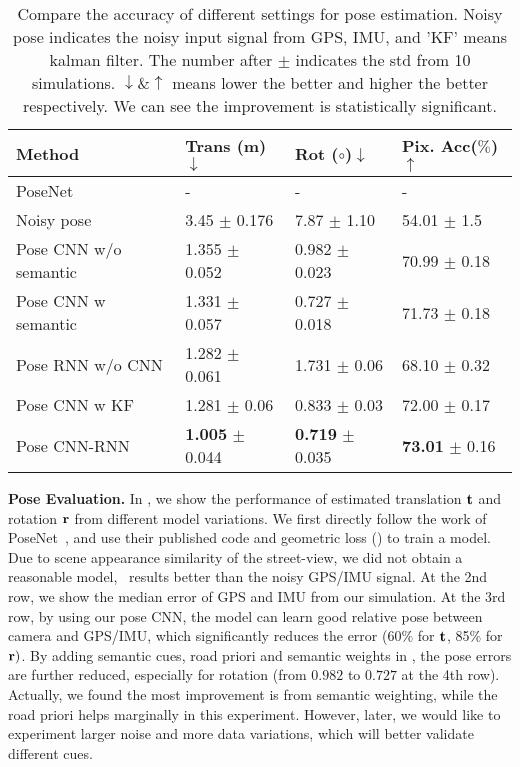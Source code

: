 \begin{table}
\vspace{-0\baselineskip}
\center
\fontsize{7}{8}\selectfont
\hspace*{-0.33cm}
\begin{tabular}{llll}
\toprule[0.1 em]
Method & Trans (m) $\downarrow$ & Rot ($\circ$)$\downarrow$  & Pix. Acc($\%$)$\uparrow$ \\
\hline
PoseNet~\cite{kendall2017geometric} & -  & -  & -  \\
Noisy pose & 3.45 $\pm$ 0.176 & 7.87 $\pm$ 1.10 & 54.01 $\pm$ 1.5 \\
Pose CNN w/o semantic & 1.355 $\pm$ 0.052  & 0.982 $\pm$ 0.023 & 70.99 $\pm$ 0.18 \\
Pose CNN w semantic & 1.331 $\pm$ 0.057  & 0.727 $\pm$ 0.018 & 71.73 $\pm$ 0.18  \\
Pose RNN w/o CNN & 1.282 $\pm$ 0.061  & 1.731 $\pm$ 0.06 &  68.10 $\pm$ 0.32 \\
Pose CNN w KF & 1.281 $\pm$ 0.06  & 0.833 $\pm$ 0.03 & 72.00 $\pm$ 0.17  \\
Pose CNN-RNN  & \textbf{1.005} $\pm$ 0.044  & \textbf{0.719} $\pm$ 0.035  & \textbf{73.01} $\pm$ 0.16  \\
\toprule[0.1 em]
\end{tabular}
\caption{Compare the accuracy of different settings for pose estimation.
Noisy pose indicates the noisy input signal from GPS, IMU, and 'KF' means kalman filter.
The number after $\pm$ indicates the std from 10 simulations. $\downarrow \& \uparrow$ means lower the better and higher the better respectively. 
We can see the improvement is statistically significant.}
\label{tbl:pose}
\vspace{-1.5\baselineskip}
\end{table}

\textbf{Pose Evaluation.}
In , we show the performance of estimated translation ${\mathbf t}$ and rotation ${\mathbf r}$ from different model variations. We first directly follow the work of PoseNet~\cite{Kendall_2015_ICCV,kendall2017geometric}, and use their published code and geometric loss () to train a model. 
Due to scene appearance similarity of the street-view, we did not obtain a reasonable model, \ie~results better than the noisy GPS/IMU signal.
At the 2nd row, we show the median error of GPS and IMU from our simulation. 
At the 3rd row, by using our pose CNN, the model can learn good relative pose between camera and GPS/IMU, which significantly reduces the error (60$\%$ for ${\mathbf t}$, 85$\%$ for ${\mathbf r})$. 
By adding semantic cues, \ie road priori and semantic weights in , the pose errors are further reduced, especially for rotation (from $0.982$ to $0.727$ at the 4th row). Actually, we found the most improvement is from semantic weighting, while the road priori helps marginally in this experiment. However, later, we would like to experiment larger noise and more data variations, which will better validate different cues.

